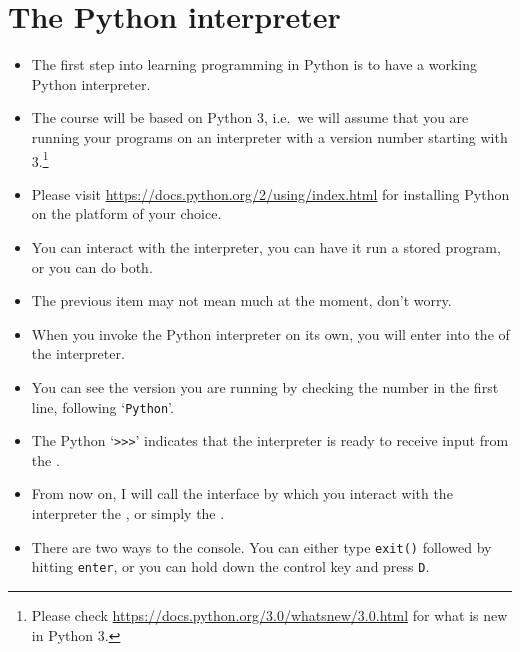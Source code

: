 \documentclass[a4paper]{article}
\begin{document}
\tableofcontents
\newpage
\section{The Python interpreter}

\begin{itemize}
\item The first step into learning programming in Python is to have a working
Python interpreter.

\item The course will be based on Python 3, i.e.\ we will assume that you are
running your programs on an interpreter with a version number starting with
3.\footnote{Please check \url{https://docs.python.org/3.0/whatsnew/3.0.html}
for what is new in Python 3.}

\item Please visit \url{https://docs.python.org/2/using/index.html} for
installing Python on the platform of your choice.

\item You can interact with the interpreter, you can have it run a stored
program, or you can do both.

\item The previous item may not mean much at the moment, don't worry. 

\item When you invoke the Python interpreter on its own, you will enter into the
 of the interpreter.


\begin{ucodeframe}

\end{ucodeframe}

\item You can see the version you are running by checking the number in the
first line, following `\Verb+Python+'.
\item The Python  `\Verb+>>>+' indicates that the interpreter is ready
to receive input from the .   
\item From now on, I will call the interface by which you interact with the
interpreter the , or simply the .
\item There are two ways to  the console. You can either type
\Verb+exit()+ followed by hitting \Verb+enter+, or you can hold down the control key and
press \Verb+D+.


\end{itemize}
\end{document}
